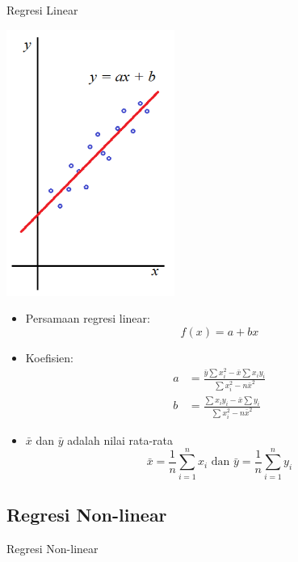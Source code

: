 \documentclass[pdflatex,compress,mathserif]{beamer}
\begin{document}
\begin{frame}{Regresi Linear}
	\begin{multicols}{2}
		\begin{center}
			\includegraphics[width=0.6\linewidth]{img/img05}
		\end{center}
		\begin{itemize}
			\item Persamaan regresi linear:
			$$ f(x) = a + bx $$
			\item Koefisien:
			\begin{align*}
				a &= \frac{\bar{y} \sum x_i^2 - \bar{x}\sum x_i y_i}{\sum x_i^2 - n\bar{x}^2} \\
				b &= \frac{\sum x_i y_i - \bar{x} \sum y_i}{\sum x_i^2 - n\bar{x}^2}
			\end{align*}
			\item $\bar{x}$ dan $\bar{y}$ adalah nilai rata-rata
			$$ \bar{x} = \frac{1}{n} \sum_{i=1}^{n} x_i \text{ dan } \bar{y} = \frac{1}{n} \sum_{i=1}^n y_i$$
		\end{itemize}
	\end{multicols}
\end{frame}

\subsection{Regresi Non-linear}

\begin{frame}{Regresi Non-linear}

\end{frame}
\end{document}
